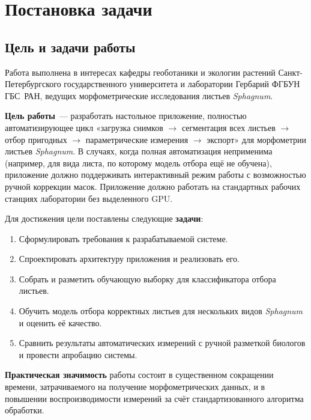 
\section{Постановка задачи}
\label{sec:task}

\subsection{Цель и задачи работы}

Работа выполнена в интересах кафедры геоботаники и экологии растений
Санкт-Петербургского государственного университета и лаборатории Гербарий
ФГБУН ГБС~РАН, ведущих морфометрические исследования листьев \textit{Sphagnum}.

\textbf{Цель работы}~--- разработать настольное приложение, полностью автоматизирующее
цикл «загрузка снимков $\to$ сегментация всех листьев $\to$ отбор пригодных $\to$
параметрические измерения $\to$ экспорт» для морфометрии листьев \textit{Sphagnum}.
В случаях, когда полная автоматизация неприменима (например, для вида листа, по которому
модель отбора ещё не обучена), приложение должно поддерживать интерактивный режим работы
с возможностью ручной коррекции масок. Приложение должно работать на стандартных рабочих
станциях лаборатории без выделенного GPU.

Для достижения цели поставлены следующие \textbf{задачи}:
\begin{enumerate}
    \item Сформулировать требования к разрабатываемой системе.
    \item Спроектировать архитектуру приложения и реализовать его.
    \item Собрать и разметить обучающую выборку для классификатора отбора листьев.
    \item Обучить модель отбора корректных листьев для нескольких видов \textit{Sphagnum}
          и оценить её качество.
    \item Сравнить результаты автоматических измерений с ручной разметкой биологов
          и провести апробацию системы.
\end{enumerate}

\textbf{Практическая значимость} работы состоит в существенном сокращении времени, затрачиваемого
на получение морфометрических данных, и в повышении воспроизводимости измерений за счёт
стандартизованного алгоритма обработки.

